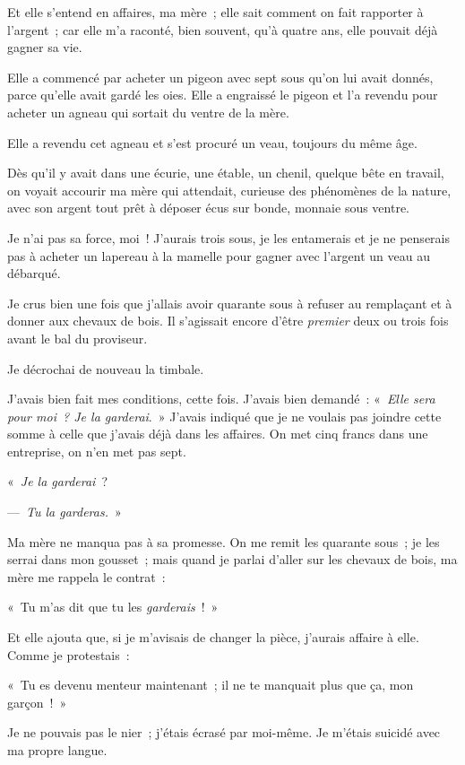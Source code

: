 \documentclass[french,twoside]{book} %
\begin{document}
Et elle s’entend en affaires, ma mère ; elle sait comment on fait rapporter à l’argent ; car elle m’a raconté, bien souvent, qu’à quatre ans, elle pouvait déjà gagner sa vie.\par
Elle a commencé par acheter un pigeon avec sept sous qu’on lui avait donnés, parce qu’elle avait gardé les oies. Elle a engraissé le pigeon et l’a revendu pour acheter un agneau qui sortait du ventre de la mère.\par
Elle a revendu cet agneau et s’est procuré un veau, toujours du même âge.\par
Dès qu’il y avait dans une écurie, une étable, un chenil, quelque bête en travail, on voyait accourir ma mère qui attendait, curieuse des phénomènes de la nature, avec son argent tout prêt à déposer écus sur bonde, monnaie sous ventre.\par
Je n’ai pas sa force, moi ! J’aurais trois sous, je les entamerais et je ne penserais pas à acheter un lapereau à la mamelle pour gagner avec l’argent un veau au débarqué.\par
\bigbreak
\noindent Je crus bien une fois que j’allais avoir quarante sous à refuser au remplaçant et à donner aux chevaux de bois. Il s’agissait encore d’être \emph{premier} deux ou trois fois avant le bal du proviseur.\par
Je décrochai de nouveau la timbale.\par
J’avais bien fait mes conditions, cette fois. J’avais bien demandé : « \emph{Elle sera pour moi ? Je la garderai}. » J’avais indiqué que je ne voulais pas joindre cette somme à celle que j’avais déjà dans les affaires. On met cinq francs dans une entreprise, on n’en met pas sept.\par
« \emph{Je la garderai} ?\par
— \emph{Tu la garderas.} »\par
Ma mère ne manqua pas à sa promesse. On me remit les quarante sous ; je les serrai dans mon gousset ; mais quand je parlai d’aller sur les chevaux de bois, ma mère me rappela le contrat :\par
« Tu m’as dit que tu les \emph{garderais} ! »\par
Et elle ajouta que, si je m’avisais de changer la pièce, j’aurais affaire à elle. Comme je protestais :\par
« Tu es devenu menteur maintenant ; il ne te manquait plus que ça, mon garçon ! »\par
Je ne pouvais pas le nier ; j’étais écrasé par moi-même. Je m’étais suicidé avec ma propre langue.\par
\end{document}
